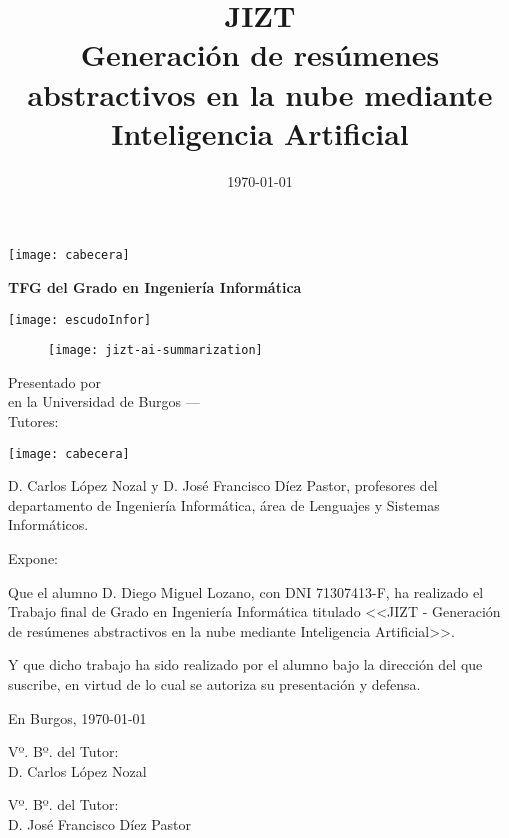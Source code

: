 \documentclass[a4paper,12pt,twoside]{memoir}
\title{\fontsize{25}{25}\selectfont JIZT \\[0.5cm] \fontsize{15}{15}\selectfont Generación de resúmenes abstractivos en la nube mediante Inteligencia Artificial}
\author{\nombre}
\date{\today}
\makeatletter
\def\maketitle{
	\null
	\thispagestyle{empty}
	\noindent\texttt{[image: cabecera]}\vspace{1cm}%
	\vfill
	\colorbox{cpardoBox}{%
		\begin{minipage}{.8\textwidth}
			\vspace{.5cm}\Large
			\begin{center}
				\textbf{TFG del Grado en Ingeniería Informática}\vspace{.6cm}\\
				\textbf{\LARGE\@title{}}
			\end{center}
			\vspace{.2cm}
		\end{minipage}
		
	}%
	\hfill\begin{minipage}{.20\textwidth}
		\texttt{[image: escudoInfor]}
	\end{minipage}

	\vspace{0.2cm}
	\begin{figure}[H]
		\centering
		\texttt{[image: jizt-ai-summarization]}
	\end{figure}
	\begin{center}%
		{%
			\noindent\fontsize{18}{18}\selectfont
			Presentado por \@author{}\\ 
			en la Universidad de Burgos --- \@date{}\\
			Tutores: \@tutor{}\\
		}%
	\end{center}%
	\vfill
	\null
	\cleardoublepage
}
\newcommand{\nombre}{Diego Miguel Lozano} %
\makeatother
\begin{document}
	
	\maketitle
	
	
	\thispagestyle{empty}
	
	
	\noindent\texttt{[image: cabecera]}\vspace{1cm}
	
	\noindent D. Carlos López Nozal y D. José Francisco Díez Pastor, profesores del departamento de Ingeniería Informática, área de Lenguajes y Sistemas Informáticos.
	
	\noindent Expone:
	
	\noindent Que el alumno D. \nombre, con DNI 71307413-F, ha realizado el Trabajo final de Grado en Ingeniería Informática titulado <<JIZT - Generación de resúmenes abstractivos en la nube mediante Inteligencia Artificial>>. 
	
	\noindent Y que dicho trabajo ha sido realizado por el alumno bajo la dirección del que suscribe, en virtud de lo cual se autoriza su presentación y defensa.
	
	\begin{center} %
		En Burgos, {\large \today}
	\end{center}
	
	\vfill\vfill\vfill
	
	\begin{minipage}{0.45\textwidth}
		\begin{flushleft} %
			Vº. Bº. del Tutor:\\[2cm]
			D. Carlos López Nozal
		\end{flushleft}
	\end{minipage}
	\hfill
	\begin{minipage}{0.45\textwidth}
		\begin{flushleft} %
			Vº. Bº. del Tutor:\\[2cm]
			D. José Francisco Díez Pastor
		\end{flushleft}
	\end{minipage}
	\hfill
	
	\vfill
	
	
	
	\newpage\null\thispagestyle{empty}\newpage
	
	
	
\end{document}
